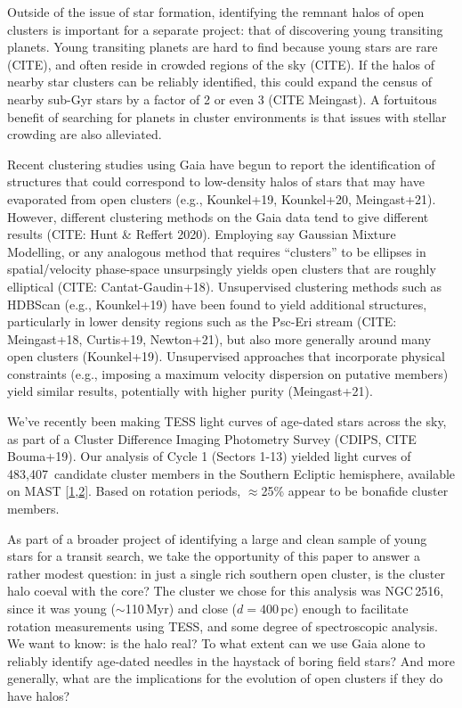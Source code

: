 \documentclass[12pt,twocolumn,tighten]{aastex63}
\newcommand{\numsouthernuniqlcs}{483{,}407\ } %
\begin{document}
Outside of the issue of star formation, identifying the remnant halos
of open clusters is important for a separate project: that of
discovering young transiting planets.  Young transiting planets are
hard to find because young stars are rare (CITE), and often reside in
crowded regions of the sky (CITE).  If the halos of nearby star
clusters can be reliably identified, this could expand the census of
nearby sub-Gyr stars by a factor of 2 or even 3 (CITE Meingast).  A
fortuitous benefit of searching for planets in cluster environments is
that issues with stellar crowding are also alleviated.

Recent clustering studies using Gaia have begun to report the
identification of structures that could correspond to low-density
halos of stars that may have evaporated from open clusters (e.g.,
Kounkel+19, Kounkel+20, Meingast+21).  However, different clustering
methods on the Gaia data tend to give different results (CITE: Hunt \&
Reffert 2020).  Employing say Gaussian Mixture Modelling, or any
analogous method that requires ``clusters'' to be ellipses in
spatial/velocity phase-space unsurpsingly yields open clusters that
are roughly elliptical (CITE: Cantat-Gaudin+18). Unsupervised
clustering methods such as HDBScan (e.g., Kounkel+19) have been found
to yield additional structures, particularly in lower density regions
such as the Psc-Eri stream (CITE: Meingast+18, Curtis+19, Newton+21),
but also more generally around many open clusters (Kounkel+19).
Unsupervised approaches that incorporate physical constraints (e.g.,
imposing a maximum velocity dispersion on putative members) yield
similar results, potentially with higher purity (Meingast+21).

We've recently been making TESS light curves of age-dated stars across
the sky, as part of a Cluster Difference Imaging Photometry Survey
(CDIPS, CITE Bouma+19).  Our analysis of Cycle 1 (Sectors 1-13)
yielded light curves of \numsouthernuniqlcs candidate cluster members
in the Southern Ecliptic hemisphere, available on MAST
[\href{https://archive.stsci.edu/hlsp/cdips}{1},\href{https://ui.adsabs.harvard.edu/abs/2019ApJS..245...13B/abstract}{2}].
Based on rotation periods, $\approx$25\% appear to be bonafide cluster
members. 

As part of a broader project of identifying a large and clean sample
of young stars for a transit search, we take the opportunity of this
paper to answer a rather modest question: in just a single rich
southern open cluster, is the cluster halo coeval with the core?  The
cluster we chose for this analysis was NGC\,2516, since it was young
($\sim$110\,Myr) and close ($d=400$\,pc) enough to facilitate rotation
measurements using TESS, and some degree of spectroscopic analysis.
We want to know: is the halo real? To what extent can we use Gaia
alone to reliably identify age-dated needles in the haystack of boring
field stars?  And more generally, what are the implications for the
evolution of open clusters if they do have halos?
\end{document}
